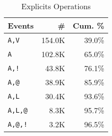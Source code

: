 \documentclass[sigplan,screen]{acmart}
\begin{document}
\begin{table}[!h]\small
  \caption{Explicits Operations} \label{table:user_explicit_env_seq}
  \centering
  \begin{tabular}{lrr}    \toprule
    \textbf{Events}&\textbf{\#}&\textbf{Cum. \%}\\
    \midrule
    \texttt{A,V}&154.0K&39.0\%\\
    \texttt{A}&102.8K&65.0\%\\
    \texttt{A,!}&43.8K&76.1\%\\
    \texttt{A,@}&38.9K&85.9\%\\
    \texttt{A,L}&30.4K&93.6\%\\
    \texttt{A,L,@}&8.3K&95.7\%\\
    \texttt{A,@,!}&3.2K&96.5\%\\
    \bottomrule
  \end{tabular}
\end{table}
\end{document}
